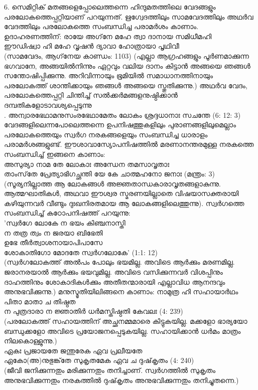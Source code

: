 6. സെമിറ്റിക് മതങ്ങളെപ്പോലെത്തന്നെ ഹിന്ദുമതത്തിലെ വേദങ്ങളും പരലോകത്തെപ്പറ്റിയാണ് പറയുന്നത്. ഋഗ്വേദത്തിലും സാമവേദത്തിലും അഥര്‍വ വേദത്തിലും പരലോകത്തെ സംബന്ധിച്ച പരാമര്‍ശം കാണാം. ഉദാഹരണത്തിന്:
രായേ അഗ്‌നേ മഹേ ത്വാ ദാനായ സമിധീമഹി\\
ഈഡിഷ്വാ ഹി മഹേ വൃഷന്‍ ദ്യാവാ ഹോത്രായാ പൃഥിവീ\\
(സാമവേദം, ആഗ്‌നേയ കാണ്ഡം: 1103)
(എല്ലാ ആഗ്രഹങ്ങളും പൂര്‍ണമാക്കുന്ന ഭഗവാനേ, അങ്ങയില്‍നിന്നും ഏറ്റവും വലിയ ദാനം കിട്ടാന്‍ അങ്ങയെ ഞങ്ങള്‍ സന്തോഷിപ്പിക്കുന്നു. അറിവിന്നായും ഭൂമിയില്‍ സമാധാനത്തിനായും പരലോകത്ത് ശാന്തിക്കായും ഞങ്ങള്‍ അങ്ങയെ സ്തുതിക്കുന്നു.)
അഥര്‍വ വേദം, പരലോകത്തെപ്പറ്റി ചിന്തിച്ച് സല്‍ക്കര്‍മങ്ങളനുഷ്ഠിക്കാന്‍ ദമ്പതികളോടാവശ്യപ്പെടുന്നു\\.
അന്വാരഭേഥാമനുസംരഭേഥാമേതം ലോകം ശ്രദ്ദധാനാഃ സചന്തേ (6: 12: 3)\\
വേദങ്ങളിലെന്നപോലെത്തന്നെ ഉപനിഷത്തുകളിലും പുരാണങ്ങളിലുമെല്ലാം പരലോകത്തെയും സ്വര്‍ഗ നരകങ്ങളെയും സംബന്ധിച്ച ധാരാളം പരാമര്‍ശങ്ങളുണ്ട്.
ഈശാവാസ്യോപനിഷത്തില്‍ മരണാനന്തരമുള്ള നരകത്തെ സംബന്ധിച്ച് ഇങ്ങനെ കാണാം:\\
അസുര്യാ നാമ തേ ലോകാഃ അന്ധേന തമസാവൃതാഃ\\
താംസ്‌തേ പ്രേത്യാഭിഗച്ഛന്തി യേ കേ ചാത്മഹനോ ജനാഃ (മന്ത്രം: 3)\\
(സൂര്യനില്ലാത്ത ആ ലോകങ്ങള്‍ അജ്ഞതാന്ധകാരാവൃതങ്ങളാകുന്നു. ആത്മഘാതികള്‍, അഥവാ ഈശ്വര സ്മരണയില്ലാതെ വിഷയാസക്തരായി കഴിയുന്നവര്‍ വീണ്ടും ദുഃഖനിരതമായ ആ ലോകങ്ങളിലെത്തുന്നു).
സ്വര്‍ഗത്തെ സംബന്ധിച്ച് കഠോപനിഷത്ത് പറയുന്നു:\\
'സ്വര്‍ഗേ ലോകേ ന ഭയം കിഞ്ചനാസ്തി\\
ന തത്ര ത്വം ന ജരയാ ബിഭേതി\\
ഉഭേ തീര്‍ത്വാശനായാപിപാസേ\\
ശോകാതിഗോ മോദതേ സ്വര്‍ഗലോകേ' (1:1: 12)\\
(സ്വര്‍ഗലോകത്ത് അല്‍പം പോലും ഭയമില്ല. അവിടെ ആര്‍ക്കും മരണമില്ല. ജരാനരയാല്‍ ആര്‍ക്കും ഭയവുമില്ല. അവിടെ വസിക്കുന്നവര്‍ വിശപ്പിനും ദാഹത്തിനും ശോകാദികള്‍ക്കും അതീതന്മാരായി എല്ലാവിധ ആനന്ദവും അനുഭവിക്കുന്നു.)
മനുസ്മൃതിയിലിങ്ങനെ കാണാം:
നാമുത്ര ഹി സഹായാര്‍ഥം പിതാ മാതാ ച തിഷ്ഠത\\
ന പുത്രദാരാ ന ജ്ഞാതിര്‍ ധര്‍മസ്തിഷ്ഠതി കേവലഃ (4: 239)\\
(പരലോകത്ത് സഹായത്തിന് അച്ഛനമ്മമാരെ കിട്ടുകയില്ല. മക്കളോ ഭാര്യയോ ബന്ധുക്കളോ അവിടെ പ്രയോജനപ്പെടുകയില്ല. സഹായിക്കാന്‍ ധര്‍മം മാത്രം നിലകൊള്ളുന്നു.)\\
ഏകഃ പ്രജായതേ ജന്തുരേക ഏവ പ്രലീയതേ\\
ഏകോ(അ)നുഭുങ്ക്‌തേ സുകൃതമേക ഏവ ച ദുഷ്‌കൃതം (4: 240)\\
(ജീവി ജനിക്കുന്നതും മരിക്കുന്നതും തനിച്ചാണ്. സ്വര്‍ഗത്തില്‍ സുകൃതം അനുഭവിക്കുന്നതും നരകത്തില്‍ ദുഷ്‌കൃതം അനുഭവിക്കുന്നതും തനിച്ചുതന്നെ.)
